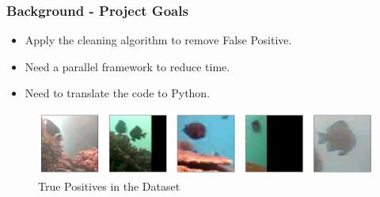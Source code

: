\documentclass{beamer}[fullspacing]
\begin{document}
\begin{frame}
\frametitle{Background - Project Goals}


\begin{itemize}
\item
Apply the cleaning algorithm to remove False Positive.
\item 
Need a parallel framework to reduce time.
\item 
Need to translate the code to Python.
\end{itemize}

\begin{figure}
\includegraphics[scale=0.23]{image/TP.png}
\caption{True Positives in the Dataset}
\end{figure}

\end{frame}
\end{document}
